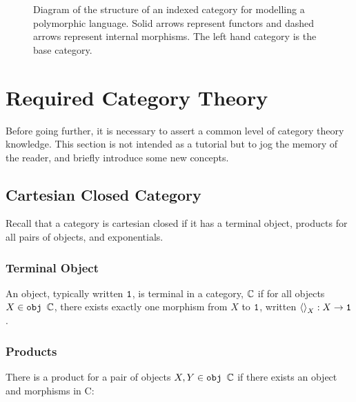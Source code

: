 \documentclass{Report}
\begin{document}
\begin{figure}[h!]
    \caption{Diagram of the structure of an indexed category for modelling a polymorphic language. Solid arrows represent functors and dashed arrows represent internal morphisms. The left hand category is the base category.}
    \label{IndexDiagram}
\end{figure}

\chapter{Required Category Theory}\label{CategoryTheoryRequirements}


Before going further, it is necessary to assert a common level of category theory knowledge. This section is not intended as a tutorial but to jog the memory of the reader, and briefly introduce some new concepts.

\section{Cartesian Closed Category}\label{CCC}
Recall that a category is cartesian closed if it has a terminal object, products for all pairs of objects, and exponentials.

\subsection{Terminal Object}
An object, typically written $\texttt{1}$, is terminal in a category, $\mathbb{C}$ if for all objects $X\in\texttt{obj }\mathbb{C}$, there exists exactly one morphism from $X$ to $\texttt{1}$, written $\left\langle\right\rangle_{X}: X \rightarrow \texttt{1}$.

\subsection{Products}
There is a product for a pair of objects $X, Y\in\texttt{obj }\mathbb{C}$ if there exists an object and morphisms in C:
\end{document}
